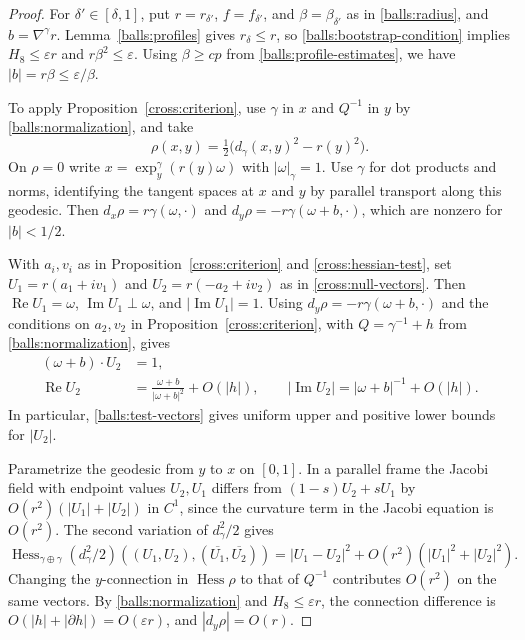 \documentclass[11pt,a4paper]{article}
\theoremstyle{definition}
\theoremstyle{remark}
\numberwithin{equation}{section}
\begin{document}
\begin{proof}
For $\delta'\in[\delta,1]$, put $r=r_{\delta'}$, $f=f_{\delta'}$,
and $\beta=\beta_{\delta'}$ as in \eqref{balls:radius}, and
$b=\nabla^\gamma r$. Lemma~\ref{balls:profiles} gives $r_\delta\leq r$,
so \eqref{balls:bootstrap-condition} implies $H_8\leq\varepsilon r$
and $r\beta^2\leq\varepsilon$. Using $\beta\geq cp$ from
\eqref{balls:profile-estimates}, we have $|b|=r\beta\leq\varepsilon/\beta$.

To apply Proposition~\ref{cross:criterion}, use $\gamma$ in $x$ and
$Q^{-1}$ in $y$ by \eqref{balls:normalization}, and take
\[
 \rho(x,y)=\tfrac12\bigl(d_\gamma(x,y)^2-r(y)^2\bigr).
\]
On $\rho=0$ write $x=\exp_y^\gamma(r(y)\omega)$ with $|\omega|_\gamma=1$.
Use $\gamma$ for dot products and norms, identifying the tangent spaces
at $x$ and $y$ by parallel transport along this geodesic. Then
$d_x\rho=r\gamma(\omega,\cdot)$ and
$d_y\rho=-r\gamma(\omega+b,\cdot)$, which are nonzero for $|b|<1/2$.

With $a_i,v_i$ as in Proposition~\ref{cross:criterion} and
\eqref{cross:hessian-test}, set $U_1=r(a_1+iv_1)$ and
$U_2=r(-a_2+iv_2)$ as in \eqref{cross:null-vectors}.
Then $\operatorname{Re}U_1=\omega$, $\operatorname{Im}U_1\perp\omega$,
and $|\operatorname{Im}U_1|=1$.
Using $d_y\rho=-r\gamma(\omega+b,\cdot)$ and the conditions on
$a_2,v_2$ in Proposition~\ref{cross:criterion}, with
$Q=\gamma^{-1}+h$ from \eqref{balls:normalization}, gives
\begin{equation}\label{balls:test-vectors}
 \begin{aligned}
  (\omega+b)\cdot U_2&=1,\\
  \operatorname{Re}U_2&=\frac{\omega+b}{|\omega+b|^2}+O(|h|),\qquad
  |\operatorname{Im}U_2|=|\omega+b|^{-1}+O(|h|).
 \end{aligned}
\end{equation}
In particular, \eqref{balls:test-vectors} gives uniform upper and
positive lower bounds for $|U_2|$.

Parametrize the geodesic from $y$ to $x$ on $[0,1]$. In a parallel
frame the Jacobi field with endpoint values $U_2,U_1$ differs from
$(1-s)U_2+sU_1$ by $O(r^2)(|U_1|+|U_2|)$ in $C^1$,
since the curvature term in the Jacobi equation is $O(r^2)$.
The second variation of $d_\gamma^2/2$ gives
\[
 \operatorname{Hess}_{\gamma\oplus\gamma}(d_\gamma^2/2)
    ((U_1,U_2),(\overline{U_1},\overline{U_2}))
 = |U_1-U_2|^2+O(r^2)(|U_1|^2+|U_2|^2).
\]
Changing the $y$-connection in $\operatorname{Hess}\rho$ to that of
$Q^{-1}$ contributes $O(r^2)$ on the same vectors. By
\eqref{balls:normalization} and $H_8\leq\varepsilon r$, the connection
difference is $O(|h|+|\partial h|)=O(\varepsilon r)$, and
$|d_y\rho|=O(r)$.


\end{proof}
\end{document}
